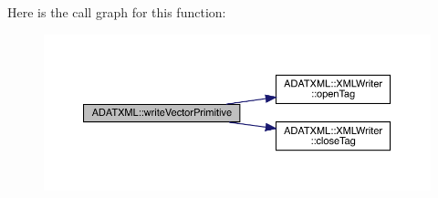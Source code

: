 Here is the call graph for this function\+:\nopagebreak
\begin{figure}[H]
\begin{center}
\leavevmode
\includegraphics[width=350pt]{d7/da0/namespaceADATXML_ac69d6dbd4a4a3ca366df448dfc85c9d2_cgraph}
\end{center}
\end{figure}
